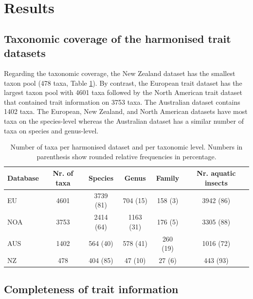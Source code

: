 \documentclass{article}
\begin{document}

\section*{Results}

\subsection*{Taxonomic coverage of the harmonised trait datasets}

Regarding the taxonomic coverage, the New Zealand dataset has the smallest taxon pool (478 taxa, Table \ref{tab:tax_coverage}). By contrast, the European trait dataset has the largest taxon pool with 4601 taxa followed by the North American trait dataset that contained trait information on 3753 taxa. The Australian dataset contains 1402 taxa. The European, New Zealand, and North American datasets have most taxa on the species-level whereas the Australian dataset has a similar number of taxa on species and genus-level.

\begin{table}[ht]
    \centering
    \caption{Number of taxa per harmonised dataset and per taxonomic level. Numbers in parenthesis show rounded relative frequencies in percentage.} 
    \label{tab:tax_coverage}
    \begin{tabular}{lccccc}
    \toprule[.1em]
    Database & Nr. of taxa & Species & Genus & Family & Nr. aquatic insects \\ 
    \toprule[.1em]
    EU & 4601 & 3739 (81) & 704 (15) & 158 (3) & 3942 (86) \\ 
    NOA & 3753 & 2414 (64) & 1163 (31) & 176 (5) & 3305 (88) \\ 
    AUS & 1402 & 564 (40) & 578 (41) & 260 (19) & 1016 (72) \\ 
    NZ & 478 & 404 (85) & 47 (10) & 27 (6) & 443 (93) \\ 
    \bottomrule
    \end{tabular}
\end{table}


\subsection*{Completeness of trait information}
\end{document}
